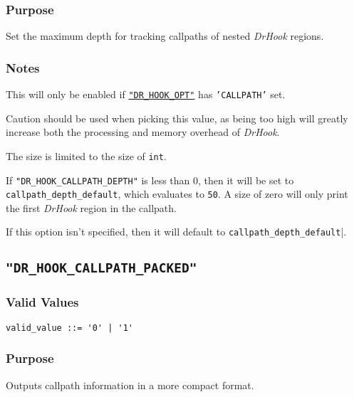 \vspace{-2ex}
\subsubsection{Purpose}
\vspace{-2ex}
Set the maximum depth for tracking callpaths of nested \textit{DrHook} regions.

\vspace{-2ex}
\subsubsection{Notes}
\vspace{-2ex}
This will only be enabled if \hyperref[section:flags:DR_HOOK_OPT]{\texttt{"DR\_HOOK\_OPT"}} has \texttt{'CALLPATH'} set.

Caution should be used when picking this value, as being too high will greatly increase both the processing and memory overhead of \textit{DrHook}.

The size is limited to the size of \verb|int|.

If \texttt{"DR\_HOOK\_CALLPATH\_DEPTH"} is less than 0, then it will be set to \verb|callpath_depth_default|, which evaluates to \verb|50|. A size of zero will only print the first \textit{DrHook} region in the callpath.

If this option isn't specified, then it will default to \verb|callpath_depth_default||.



\subsection{\texttt{"DR\_HOOK\_CALLPATH\_PACKED"}}
\label{section:flags:DR_HOOK_CALLPATH_PACKED}
\vspace{-2ex}
\subsubsection{Valid Values}
\vspace{-2ex}
\verb+valid_value ::= '0' | '1' +\\

\vspace{-2ex}
\subsubsection{Purpose}
\vspace{-2ex}
Outputs callpath information in a more compact format.

